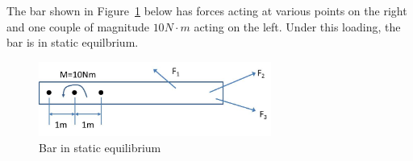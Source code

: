 
\noindent The bar shown in Figure~\ref{fig:Orig} below has forces acting at various points on the right and one couple of
magnitude $10 N \cdot m$ acting on the left.  Under this loading, the bar is in static equilbrium.

 \begin{figure}[ht!]
    \centering
    \includegraphics[width=3in]{BarOriginal.jpg}
    \caption{Bar in static equilibrium}
    \label{fig:Orig}
  \end{figure}

